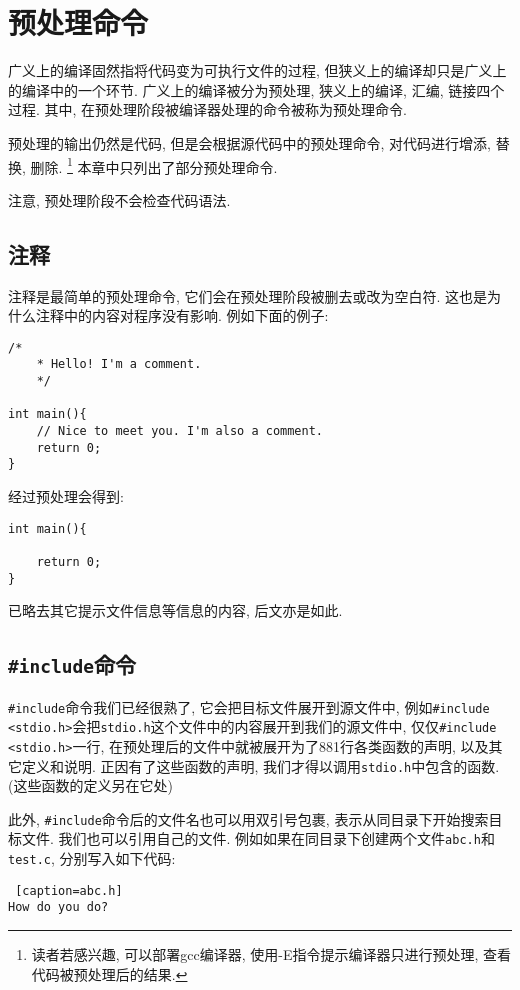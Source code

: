 \chapter{预处理命令} \label{预处理命令}
        广义上的编译固然指将代码变为可执行文件的过程, 但狭义上的编译却只是广义上的编译中的一个环节. 广义上的编译被分为预处理, 狭义上的编译, 汇编, 链接四个过程. 其中, 在预处理阶段被编译器处理的命令被称为预处理命令.

        预处理的输出仍然是代码, 但是会根据源代码中的预处理命令, 对代码进行增添, 替换, 删除. \footnote{读者若感兴趣, 可以部署gcc编译器, 使用-E指令提示编译器只进行预处理, 查看代码被预处理后的结果.} 本章中只列出了部分预处理命令.

        注意, 预处理阶段不会检查代码语法.

    \section{注释}
        注释是最简单的预处理命令, 它们会在预处理阶段被删去或改为空白符. 这也是为什么注释中的内容对程序没有影响. 例如下面的例子:
\begin{lstlisting}
/*
    * Hello! I'm a comment.
    */

int main(){
    // Nice to meet you. I'm also a comment.
    return 0;
}
\end{lstlisting}
        经过预处理会得到:
\begin{lstlisting}
int main(){

    return 0;
}
\end{lstlisting}
        
        已略去其它提示文件信息等信息的内容, 后文亦是如此.

    \section{\texttt{\#include}命令}
        \texttt{\#include}命令我们已经很熟了, 它会把目标文件展开到源文件中, 例如\texttt{\#include <stdio.h>}会把\texttt{stdio.h}这个文件中的内容展开到我们的源文件中, 仅仅\texttt{\#include <stdio.h>}一行, 在预处理后的文件中就被展开为了881行各类函数的声明, 以及其它定义和说明. 正因有了这些函数的声明, 我们才得以调用\texttt{stdio.h}中包含的函数. (这些函数的定义另在它处)

        此外, \texttt{\#include}命令后的文件名也可以用双引号包裹, 表示从同目录下开始搜索目标文件. 我们也可以引用自己的文件. 例如如果在同目录下创建两个文件\texttt{abc.h}和\texttt{test.c}, 分别写入如下代码:
\begin{lstlisting} [caption=abc.h]
How do you do?
\end{lstlisting}

